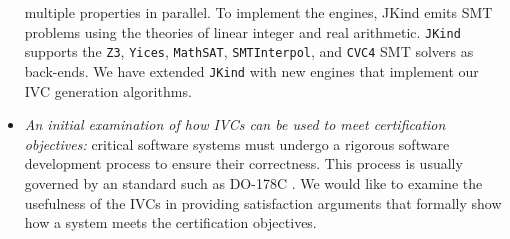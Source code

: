 \begin{itemize}
multiple properties in parallel. To implement the engines,
JKind emits SMT problems using the theories of linear integer and real arithmetic. \texttt{JKind} supports the \texttt{Z3}, \texttt{Yices}, \texttt{MathSAT}, \texttt{SMTInterpol}, and \texttt{CVC4} SMT solvers as back-ends.  We have extended \texttt{JKind} with new engines that implement our IVC generation algorithms.
\item \emph{An initial examination of how IVCs can be used to meet certification objectives:}  critical software systems must undergo a rigorous software development process to ensure their correctness. This process is usually governed by an standard such as DO-178C \cite{DO178C}. We would like to examine the usefulness of the IVCs in providing satisfaction arguments that formally show how a system meets the certification objectives.

\end{itemize}

